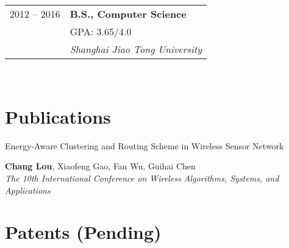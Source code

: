 \documentclass[10pt]{article} %
\begin{document}
{\begin{minipage}[t]{0.44\textwidth}
\begin{tabular}{rl} %


2012 -- 2016 & \textbf{B.S., Computer Science} \\ 
& \textsc{GPA: 3.65/4.0} \\ 
& \textit{Shanghai Jiao Tong University}\\

	

\end{tabular}\\[10pt]




\section{Publications} 




{\raggedright\large Energy-Aware Clustering and Routing Scheme in Wireless Sensor Network\\
[5pt]}
\normalsize{\textbf{Chang Lou}, Xiaofeng Gao, Fan Wu, Guihai Chen}\\
\textit{The 10th International Conference on Wireless Algorithms, Systems, and Applications}\\ 


\section{Patents (Pending)} 





\end{minipage}}
\end{document}
